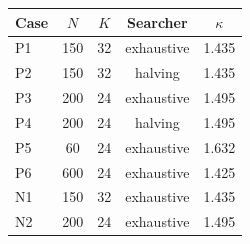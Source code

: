 \begin{tabular}{lcccc}
\toprule
Case & $N$ & $K$ & Searcher & $\kappa$ \\
\midrule
P1 & 150 & 32 & exhaustive & 1.435 \\
P2 & 150 & 32 & halving & 1.435 \\
P3 & 200 & 24 & exhaustive & 1.495 \\
P4 & 200 & 24 & halving & 1.495 \\
P5 & 60 & 24 & exhaustive & 1.632 \\
P6 & 600 & 24 & exhaustive & 1.425 \\
N1 & 150 & 32 & exhaustive & 1.435 \\
N2 & 200 & 24 & exhaustive & 1.495 \\
\bottomrule
\end{tabular}
